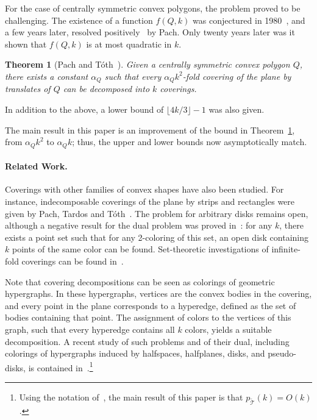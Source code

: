 \documentclass[english,11pt]{article}
\newtheorem{theorem}{Theorem}
\newcommand{\tr}{{\mathcal T}}
\renewcommand{\bar}[1]{\textstyle\widetilde{\scriptstyle{#1}}}
\begin{document}
For the case of centrally symmetric convex polygons, the problem proved to be challenging. The existence of a function $f(Q,k)$
was conjectured in 1980~\cite{Pa80}, and a few years later, resolved positively~\cite{Pach86} by Pach. Only twenty years later was it shown that $f(Q,k)$ is at most quadratic in $k$.

\begin{theorem}[Pach and T\'{o}th~\cite{PT07}]
\label{we-beat-pach}
Given a centrally symmetric convex polygon $Q$, there exists a constant $\alpha_Q$ such that every $\alpha_Q k^2$-fold covering of the plane by translates of $Q$ can be decomposed into $k$ coverings.
\end{theorem}

\noindent  In addition to the above, a lower bound of  $\lfloor {4k/3}\rfloor{-}1$ was also given.\medskip

The main result  in this paper is an improvement of the bound in Theorem~\ref{we-beat-pach}, from $\alpha_Q k^2$ to $\alpha_Q k$; thus, the upper and lower bounds now asymptotically match.

\paragraph{Related Work.} 
Coverings with other families of convex shapes have also been studied. For instance, indecomposable coverings of the plane by strips and rectangles were given by Pach, Tardos and T\'{o}th~\cite{PTT07}. The problem for arbitrary disks remains open, although a negative result for the dual problem was proved in~\cite{PTT07}: for any $k$, there exists a point set such that for any 2-coloring of this set, an open disk containing $k$ points of the same color can be found. Set-theoretic investigations of infinite-fold coverings can be found in~\cite{settheo}.

Note that covering decompositions can be seen as colorings of geometric hypergraphs. In these hypergraphs, vertices are the convex bodies in the covering, and every point in the plane corresponds to a hyperedge, defined as the set of bodies containing that point.
The assignment of colors to the vertices of this graph, such that every hyperedge contains all $k$ colors, yields a suitable decomposition.
A recent study of such problems and of their dual, including colorings of hypergraphs induced by halfspaces, halfplanes,  disks, and pseudo-disks, is contained in~\cite{ACCLS08}.\footnote{Using the notation of~\cite{ACCLS08}, the main result of this paper is that $p_{\bar{\tr}}(k) = O(k)$.}\medskip
\end{document}
